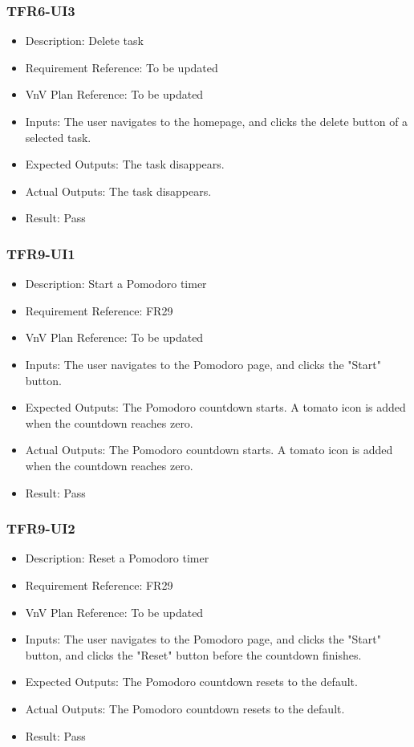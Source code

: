 \documentclass[12pt, titlepage]{article}
\begin{document}
\subsubsection{TFR6-UI3}\label{3.2.9}
\begin{itemize}
    \item Description: Delete task
    \item Requirement Reference: To be updated
    \item VnV Plan Reference: To be updated
    \item Inputs: The user navigates to the homepage, and clicks the delete button of a selected task.
    \item Expected Outputs: The task disappears.
    \item Actual Outputs: The task disappears.
    \item Result: Pass
\end{itemize}

\subsubsection{TFR9-UI1}\label{3.2.10}
\begin{itemize}
    \item Description: Start a Pomodoro timer
    \item Requirement Reference: FR29
    \item VnV Plan Reference: To be updated
    \item Inputs: The user navigates to the Pomodoro page, and clicks the "Start" button.
    \item Expected Outputs: The Pomodoro countdown starts.  A tomato icon is added when the countdown reaches zero.
    \item Actual Outputs: The Pomodoro countdown starts.  A tomato icon is added when the countdown reaches zero.
    \item Result: Pass
\end{itemize}

\subsubsection{TFR9-UI2}\label{3.2.11}
\begin{itemize}
    \item Description: Reset a Pomodoro timer
    \item Requirement Reference: FR29
    \item VnV Plan Reference: To be updated
    \item Inputs: The user navigates to the Pomodoro page, and clicks the "Start" button, and clicks the "Reset" button before the countdown finishes.
    \item Expected Outputs: The Pomodoro countdown resets to the default.
    \item Actual Outputs: The Pomodoro countdown resets to the default.
    \item Result: Pass
\end{itemize}
\end{document}
